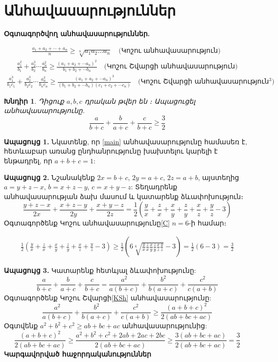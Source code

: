 \documentclass{article}
\newtheorem{problem}{Խնդիր}
\numberwithin{equation}
\begin{document}
\section{Անհավասարություններ}

\textbf {Օգտագործվող անհավասարություններ.}

\begin{align}
\frac{a_1+a_2+\cdots +a_n}{n} \ge \sqrt[n]{a_1a_2\ldots a_n}\quad  \text{(Կոշու անհավասարություն) }\label{C} 
\end{align}
\begin{align}
\frac{a_1^2}{b_1}+\frac{a_2^2}{b_2}\cdots \frac{a_n^2}{b_n} \ge \frac{(a_1+a_2+\cdots a_n)^2}{b_1+b_2+ \cdots b_n}  \quad \text{(Կոշու Շվարցի անհավասարություն)} \label{KSh}
\end{align}
\begin{align}
\frac{a_1^3}{b_1c_1}+\frac{a_2^3}{b_2c_2}\cdots \frac{a_n^3}{b_nc_n} \ge \frac{(a_1+a_2+\cdots a_n)^3}{(b_1+b_2+ \cdots b_n)(c_1+c_2+ \cdots c_n)}  \quad \text{(Կոշու Շվարցի անհավասարություն$^3$)} \label{KSh3}
\end{align}
\begin{problem}
Դիցուք $a,b,c$ դրական թվեր են ։ Ապացուցել անհավասարությունը.
\begin{equation}\label{main}
 \frac{a}{b+c}+\frac{b}{a+c}+\frac{c}{b+c} \ge \frac{3}{2}    
\end{equation}

\end{problem}
\textbf {Ապացույց 1.}
Նկատենք, որ \eqref{main} անհավասարությունը համասեռ է, հետևաբար առանց ընդհանրությունը խախտելու կարելի է ենթադրել, որ $a+b+c=1$:


\textbf{Ապացույց 2.}
Նշանակենք $2x=b+c$, $2y=a+c$, $2z=a+b$, այստեղից $a=y+z-x$, $b=x+z-y$, $c=x+y-z$: Տեղադրենք անհավասարության ձախ մասում և կատարենք ձևափոխություն։
$$
\frac{y+z-x}{2x}+\frac{x+z-y}{2y}+\frac{x+y-z}{2z}=\frac{1}{2}(\frac{y}{x}+\frac{z}{x}+\frac{x}{y}+\frac{z}{y}+\frac{x}{z}+\frac{y}{z}-3)
$$
Օգտագործենք Կոշու անհավասարությունը\eqref{C} $n=6$-ի համար։

\begin{align}
\frac{1}{2}(\frac{y}{x}+\frac{z}{x}+\frac{x}{y}+\frac{z}{y}+\frac{x}{z}+\frac{y}{z}-3) \ge \frac{1}{2}(6\sqrt[6]{\frac{y}{x}\frac{z}{x}\frac{x}{y}\frac{z}{y}\frac{x}{z}\frac{y}{z}}-3)=\frac{1}{2}(6-3)=\frac{3}{2}
\end{align}


\textbf{Ապացույց 3.}
Կատարենք հետևյալ ձևափոխությունը:
\begin{equation}
 \frac{a}{b+c}+\frac{b}{a+c}+\frac{c}{b+c}=\frac{a^2}{a(b+c)}+\frac{b^2}{b(a+c)}+\frac{c^2}{c(a+b)}    
\end{equation}
Օգտագործենք Կոշու Շվարցի\eqref{KSh} անհավասարությունը:
\begin{equation}
\frac{a^2}{a(b+c)}+\frac{b^2}{b(a+c)}+\frac{c^2}{c(a+b)} \ge \frac{(a+b+c)^2}{2(ab+bc+ac)}  
\end{equation}
Օգտվենք $a^2+b^2+c^2 \ge ab+bc+ac$ անհավասարությունից:
\begin{equation}
\frac{(a+b+c)^2}{2(ab+bc+ac)}  \ge \frac{a^2+b^2+c^2+2ab+2ac+2bc}{2(ab+bc+ac)} \ge \frac{3(ab+bc+ac)}{2(ab+bc+ac)}=\frac{3}{2}
\end{equation}
\textbf{Կարգավորված հաջորդականություններ}
\end{document}
